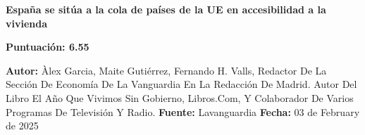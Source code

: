 \documentclass[10pt,a4paper]{article}
\begin{document}
\begin{center}
    {\Huge\bfseries Espa\~{n}a se sit\'{u}a a la cola de pa\'{i}ses de la UE en accesibilidad a la vivienda\par}
    \vspace{0.5em}
    {\large\bfseries Puntuación: 6.55\par}
\end{center}
\vspace{1em}

\noindent\textbf{Autor:} \`{A}lex Garcia, Maite Guti\'{e}rrez, Fernando H. Valls, Redactor De La Secci\'{o}n De Econom\'{i}a De La Vanguardia En La Redacci\'{o}n De Madrid. Autor Del Libro {}El A\~{n}o Que Vivimos Sin Gobierno{}, Libros.Com, Y Colaborador De Varios Programas De Televisi\'{o}n Y Radio. \hfill \textbf{Fuente:} Lavanguardia \hfill \textbf{Fecha:} 03 de February de 2025\par
\vspace{1em}

\end{document}
